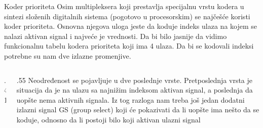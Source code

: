 \begin{frame}[label=03-s016]{Koder prioriteta}
\gusttekst
Osim multipleksera koji prestavlja specijalnu vrstu kodera u sintezi složenih digitalnih sistema (pogotovo u procesorskim) se najčešće koristi koder prioriteta. Osnovna njegova uloga jeste da koduje indeks ulaza na kojem se nalazi aktivan signal i najveće je vrednosti. Da bi bilo jasnije da vidimo funkcionalnu tabelu kodera prioriteta koji ima 4 ulaza. Da bi se kodovali indeksi potrebne su nam dve izlazne promenjive.
\begin{columns}[c,onlytextwidth]
\begin{column}{.41\textwidth}

\end{column}
\begin{column}{.55\textwidth}
Neodređenost se pojavljuje u dve poslednje vrste. Pretposlednja vrsta je situacija da je na ulazu sa najnižim indeksom aktivan signal, a poslednja da uopšte nema aktivnih signala. Iz tog razloga nam treba još jedan dodatni izlazni signal GS (group select) koji će pokazivati da li uopšte ima nešto da se koduje, odnosno da li postoji bilo koji aktivan ulazni signal
\end{column}
\end{columns}
\end{frame}
